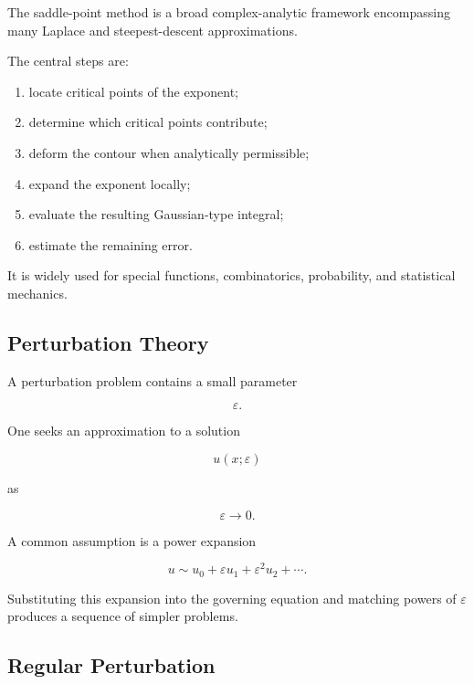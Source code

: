 The saddle-point method is a broad complex-analytic framework encompassing
many Laplace and steepest-descent approximations.

The central steps are:

\begin{enumerate}
    \item locate critical points of the exponent;
    \item determine which critical points contribute;
    \item deform the contour when analytically permissible;
    \item expand the exponent locally;
    \item evaluate the resulting Gaussian-type integral;
    \item estimate the remaining error.
\end{enumerate}

It is widely used for special functions, combinatorics, probability, and
statistical mechanics.

\subsection{Perturbation Theory}
\label{subsec:asymptotic-perturbation-theory}

A perturbation problem contains a small parameter

\[
\varepsilon.
\]

One seeks an approximation to a solution

\[
u(x;\varepsilon)
\]

as

\[
\varepsilon\to0.
\]

A common assumption is a power expansion

\[
\boxed{
u
\sim
u_0
+
\varepsilon u_1
+
\varepsilon^2u_2
+\cdots.
}
\]

Substituting this expansion into the governing equation and matching
powers of \(\varepsilon\) produces a sequence of simpler problems.

\subsection{Regular Perturbation}
\label{subsec:regular-perturbation}

